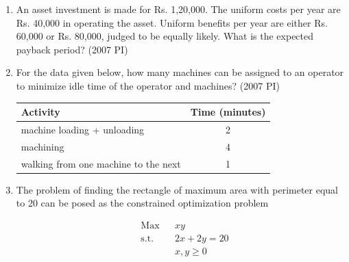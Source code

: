 \begin{enumerate}[label=\thesubsection.\arabic*,ref=\thesubsection.\theenumi]
\item 
An asset investment is made for Rs. 1,20,000. The uniform costs per year are Rs. 40,000 in operating the asset. Uniform benefits per year are either Rs. 60,000 or Rs. 80,000, judged to be equally likely. What is the expected payback period?
\hfill (2007 PI)
\begin{enumerate}
\end{enumerate}
\item 
For the data given below, how many machines can be assigned to an operator to minimize 
idle time of the operator and machines?
\hfill (2007 PI)
\begin{center}
\begin{tabular}{|l|c|}
\hline
{Activity} & {Time (minutes)} \\
\hline
machine loading + unloading & 2 \\
machining & 4 \\
walking from one machine to the next & 1 \\
\hline
\end{tabular}
\end{center}
\begin{enumerate}
    \end{enumerate}

\item 
The problem of finding the rectangle of maximum area with perimeter equal to 20 
can be posed as the constrained optimization problem

\[
\begin{aligned}
&\text{Max} && xy \\
&\text{s.t.} && 2x + 2y = 20 \\
& && x, y \geq 0
\end{aligned}
\]


\end{enumerate}

